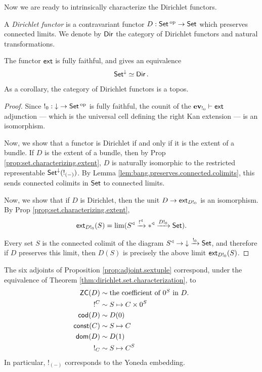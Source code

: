 Now we are ready to intrinsically characterize the Dirichlet functors.
\begin{defn}
A \emph{Dirichlet functor} is a contravariant functor $D : \operatorname{\mathsf{{Set}}}\operatorname{^\textnormal{op}} \to \operatorname{\mathsf{{Set}}}$
which preserves connected limits. We denote by $\operatorname{\mathsf{{Dir}}}$ the category of Dirichlet functors and natural transformations.
\end{defn}


\begin{thm}\label{thm:dirichlet.set.characterization}
  The functor $\operatorname{\mathsf{{ext}}}$ is fully faithful, and gives an equivalence
  $$\operatorname{\mathsf{{Set}}}^{\mathbin{\downarrow}} \simeq \operatorname{\mathsf{{Dir}}}.$$

  As a corollary, the category of Dirichlet functors is a topos.
\end{thm}
\begin{proof}
Since $!_0 : \mathbin{\downarrow} \to \operatorname{\mathsf{{Set}}}\operatorname{^\textnormal{op}}$ is fully faithful, the counit of the
$\operatorname{\textbf{ev}}_{!_0} \vdash \operatorname{\mathsf{{ext}}}$ adjunction --- which is the universal cell defining the
right Kan extension --- is an isomorphism. 
  
Now, we show that a functor is Dirichlet if and only if it is the extent of a bundle. If $D$ is
the extent of a bundle, then by Prop \ref{prop:set.characterizing.extent}, $D$ is naturally
isomorphic to the restricted representable $\operatorname{\mathsf{{Set}}}^{\mathbin{\downarrow}}(!_{(-)})$. By Lemma
\ref{lem:bang.preserves.connected.colimits}, this sends connected colimits in $\operatorname{\mathsf{{Set}}}$ to
connected limits.

Now, we show that if $D$ is Dirichlet, then the unit
$D \to \operatorname{\mathsf{{ext}}}_{D!_0}$ is an isomorphism. By Prop
\ref{prop:set.characterizing.extent}, 
  $$\operatorname{\mathsf{{ext}}}_{D!_0}(S) = \lim(S^{\triangleleft} \xrightarrow{!^{\triangleleft}} \ast^{\triangleleft}
  \xrightarrow{D!_0} \operatorname{\mathsf{{Set}}}).$$
  
Every set $S$ is the connected colimit of the diagram $S^{\triangleleft} \to
\mathbin{\downarrow} \xrightarrow{!_0} \operatorname{\mathsf{{Set}}}$, and therefore if $D$ preserves this limit, then
$D(S)$ is precisely the above limit $\operatorname{\mathsf{{ext}}}_{D!_0}(S)$.
\end{proof}

\begin{rmk}
The six adjoints of Proposition \ref{prop:adjoint.sextuple} correspond, under
the equivalence of Theorem \ref{thm:dirichlet.set.characterization}, to
\begin{align*}
  \mathsf{{ZC}}(D) &\sim \mbox{the coefficient of $0^S$ in $D$.}\\
  !^{C} &\sim S \mapsto C \times 0^S \\
  \operatorname{\mathsf{{cod}}}(D) &\sim D(0) \\
  \mathsf{{const}}(C) &\sim S \mapsto C \\
  \operatorname{\mathsf{{dom}}}(D) &\sim D(1) \\
  !_{C} &\sim S \mapsto C^S 
\end{align*}
In particular, $!_{(-)}$ corresponds to the Yoneda embedding.
\end{rmk}

